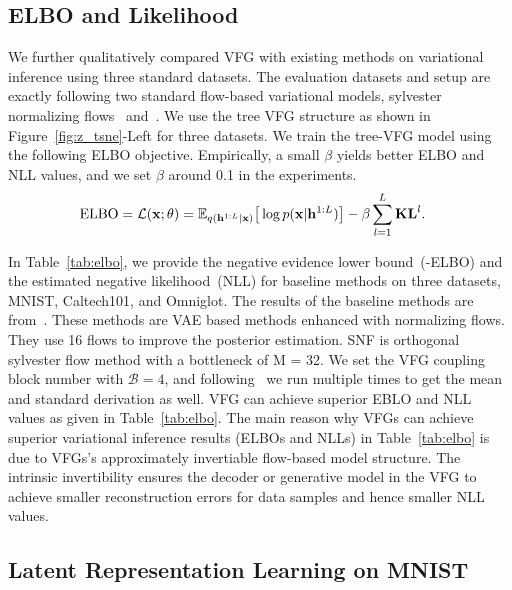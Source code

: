\documentclass[sigconf, anonymous, review]{acmart}
\theoremstyle{plain}
\theoremstyle{definition}
\theoremstyle{remark}
\begin{document}
\subsection{ELBO and Likelihood}\label{sec:exp:elbo}
We further qualitatively compared VFG with existing methods on variational inference using three standard datasets.
The evaluation datasets and setup are exactly following two standard flow-based variational models, sylvester normalizing flows~\cite{berg2018sylvester} and~\cite{rezende2015variational}.  We use the  tree VFG structure as shown in Figure~\ref{fig:z_tsne}-Left for three datasets. We train the tree-VFG model using the following ELBO objective. Empirically, a small $\beta$ yields better ELBO and NLL values, and we set $\beta$ around 0.1 in the experiments. 
\begin{align} \notag %
&\text{ELBO}= \mathcal{L}(\mathbf{x}; \theta) 
    = \mathbb{E}_{q(\mathbf{h}^{1:L}|\mathbf{x})}\big[ \log p(\mathbf{x}|\mathbf{h}^{1:L})  \big] - \beta\sum_{l=1}^{L} \mathbf{KL}^l.
\end{align}

In Table~\ref{tab:elbo}, we provide the negative evidence lower bound~(-ELBO) and the estimated negative likelihood~(NLL) for baseline methods on three datasets, MNIST, Caltech101, and Omniglot. The results of the baseline methods are from~\cite{berg2018sylvester}. These methods are VAE based methods  enhanced with  normalizing flows.  They use 16 flows to improve the posterior estimation. SNF is orthogonal sylvester flow method with a bottleneck of M = 32. We set the VFG coupling block\cite{Dinh2016DensityEU} number with  $\mathcal{B}=4$, and following~\cite{berg2018sylvester} we run multiple times to get the mean and standard derivation as well. VFG can achieve superior EBLO and NLL values as given in Table~\ref{tab:elbo}.  The main reason why VFGs can achieve superior variational inference results (ELBOs and  NLLs) in Table~\ref{tab:elbo} is due to VFGs's approximately invertiable flow-based model structure. 
The intrinsic invertibility ensures the decoder or generative model in the VFG to achieve smaller reconstruction errors for data samples and hence smaller NLL values.



\subsection{Latent Representation Learning on MNIST}\label{sec:exp:mnist}
\end{document}
